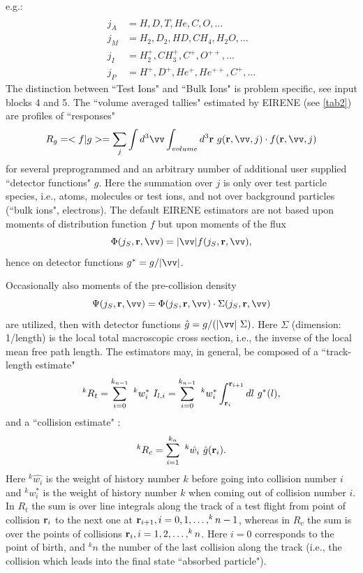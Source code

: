 e.g.:
\begin{align}
      &                                                  \\
  j_A & = H, D, T, He, C, O,  \dots \nonumber            \\
  j_M & = H_2, D_2,  HD, CH_4, H_2 O,  \dots \nonumber   \\
  j_I & = H_2^+, CH_3^+,  C^+, O^{++}, \dots  \nonumber  \\
  j_P & = H^+, D^+, He^+,  He^{++}, C^+, \dots \nonumber
\end{align}
The distinction between ``Test Ions" and ``Bulk Ions" is problem specific, see
input blocks 4 and 5.
The ``volume averaged tallies" estimated by EIRENE (see \cref{tab2}) are
profiles of ``responses"
\begin{displaymath}
  R_g = <	f | g	> = \sum_{j}
  \int d^3 \vv \int_{volume} d^3 \vr \ g(\vr, \vv , j)	 \cdot	   f(\vr, \vv,
  j)\label{est}
\end{displaymath}
for several preprogrammed and an arbitrary
number of additional user supplied ``detector functions" $g$.
Here the summation over $j$ is only over test particle species, i.e., atoms,
molecules or test ions, and not over background particles (``bulk ions",
electrons).
The default EIRENE estimators are not based upon moments of distribution
function $f$ but upon moments of the flux
\begin{displaymath}
  \Phi ( j_S, \vr,
  \vv ) = | \vv |  f(j_S, \vr, \vv),
\end{displaymath}
hence on detector
functions $g^{*} = g / | \vv | $.

Occasionally also moments of the pre-collision density
\begin{displaymath}
  \Psi
  ( j_S, \vr, \vv ) = \Phi ( j_S, \vr, \vv ) \cdot     \Sigma ( j_S, \vr, \vv )
\end{displaymath}
are utilized, then with detector functions $ \hat{g} = g / (|
  \vv | \ \Sigma)  $.
Here $\Sigma$ (dimension: 1/length) is the local total macroscopic cross
section, i.e., the inverse of the local mean free path length.
The estimators may, in general, be composed of a ``track-length estimate"
\begin{equation}
  \label{tracklest} ^k{R_t} = \sum_{i=0}^{k_{n-1}}   \ ^k w_i^*
  \  I_{l,i} = \sum_{i=0}^{k_{n-1}} \ ^k w_i^* \int_{\mathbf{r}_i}^{\mathbf{r}_{i+1}}	dl \
  g^{*} (l),
\end{equation}
and a ``collision estimate" :
\begin{equation}
  \label{collest}
  ^k{R_c} = \sum_{i=1}^{k_n}   \ ^k{\hat{w_i}} \
  \hat{g}
  ( \mathbf{r}_i )	.
\end{equation}
Here $	^k{\hat{w_i}}$ is the weight of history number $k$ before going into
collision number $i$ and $ ^k{w_{i}^{*}}$ is the weight of history number $k$
when coming out of collision number $i$.
In $R_t$ the sum is over line integrals along the track of a test flight from
point of collision $ \mathbf{r}_i$ to the next one at $\mathbf{r}_{i+1}, i=0,1, \dots,
  ^k{n-1} $, whereas in $R_c$ the sum is over the points of collisions $\mathbf{r}_i,
  i=1,2, \dots, ^kn$.
Here $i=0$ corresponds to the point of birth, and $^kn$ the number of the last
collision along the track (i.e., the collision which leads into the final state
``absorbed particle").

